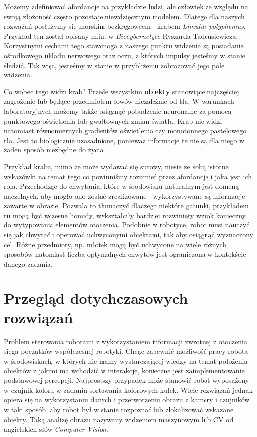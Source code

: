 \documentclass[12pt]{article}
\begin{document}
Możemy zdefiniować afordancje na przykładzie ludzi, ale człowiek ze względu na swoją złożoność często pozostaje niewdzięcznym modelem. Dlatego dla naszych rozważań posłużymy się morskim bezkręgowcem - krabem \emph{Limulus polyphemus}. Przykład ten został opisany m.in. w \emph{Biocybernetyce} Ryszarda Tadeusiewicza. Korzystnymi cechami tego stawonoga z naszego punktu widzenia są posiadanie ośrodkowego układu nerwowego oraz oczu, z których impulsy jesteśmy w stanie śledzić. Tak więc, jesteśmy w stanie w przybliżeniu zobrazować jego pole widzenia. 

Co wobec tego widzi krab? Przede wszystkim \textbf{obiekty} stanowiące najczęściej zagrożenie lub będące przedmiotem łowów niezależnie od tła. W warunkach laboratoryjnych możemy także osiągnąć pobudzenie neuronalne za pomocą punktowego oświetlenia lub gwałtownych zmian światła. Krab nie widzi natomiast równomiernych gradientów oświetlenia czy monotonnego pastelowego tła. Jest to biologicznie uzasadnione, ponieważ informacje te nie są dla niego w żaden sposób niezbędne do życia. 

Przykład kraba, mimo że może wydawać się surowy, niesie ze sobą istotne wskazówki na temat tego co powinniśmy rozumieć przez afordancje i jaka jest ich rola. Przechodząc do chwytania, które w środowisku naturalnym jest domeną naczelnych, aby mogło ono zostać zrealizowane -  wykorzystywane są informacje zawarte w obrazie. Pozwala to tłumaczyć dlaczego niektóre gatunki, przykładem tu mogą być wczesne homidy, wykształciły bardziej rozwinięty wzrok konieczny do wytypowania elementów otoczenia. Podobnie w robotyce, robot musi nauczyć się jak chwytać i operować uchwyconymi obiektami, tak aby osiągnąć wyznaczony cel. Różne przedmioty, np. młotek mogą być uchwycone na wiele różnych sposobów natomiast liczba optymalnych chwytów jest ograniczona w kontekście danego zadania. 

\newpage
\section{Przegląd dotychczasowych rozwiązań}
Problem sterowania robotami z wykorzystaniem informacji zwrotnej z otoczenia sięga początków współczesnej robotyki. Chcąc zapewnić możliwość pracy robota w środowiskach, w których nie mamy wystarczającej wiedzy na temat położenia obiektów z jakimi ma wchodzić w interakcje, konieczne jest zaimplementowanie podstawowej percepcji. Najprostszy przypadek może stanowić robot wyposażony w czujnik koloru w zadaniu sortowania kolorowych kulek. Wiele rozwiązań jednak opiera się na wykorzystaniu danych i przetworzeniu obrazu z kamery i czujników w taki sposób, aby robot był w stanie rozpoznać lub zlokalizować wskazane obiekty. Taką analizę obrazu nazywany widzeniem maszynowym lub CV od angielskich słów \emph{Computer Vision}.
\end{document}
